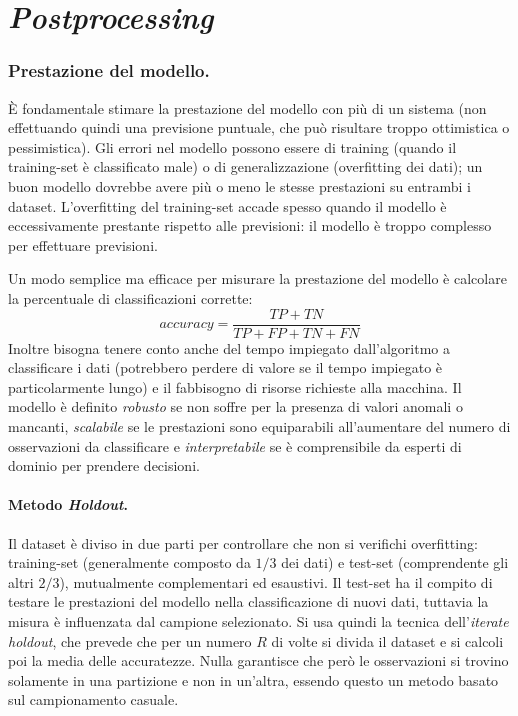 \documentclass[11pt, a4page, twocolumn]{article}
\begin{document}
\newpage
\part{\textit{Postprocessing}}

\section{Prestazione del modello.}
È fondamentale stimare la prestazione del modello con più di un sistema (non effettuando quindi una previsione puntuale, che può risultare troppo ottimistica o pessimistica).
Gli errori nel modello possono essere di training (quando il training-set è classificato male) o di generalizzazione (overfitting dei dati); un buon modello dovrebbe avere più o meno le stesse prestazioni su entrambi i dataset.
L'overfitting del training-set accade spesso quando il modello è eccessivamente prestante rispetto alle previsioni: il modello è troppo complesso per effettuare previsioni.

Un modo semplice ma efficace per misurare la prestazione del modello è calcolare la percentuale di classificazioni corrette:
\begin{equation*}
  accuracy = \frac{TP + TN}{TP + FP + TN + FN}
\end{equation*}
Inoltre bisogna tenere conto anche del tempo impiegato dall'algoritmo a classificare i dati (potrebbero perdere di valore se il tempo impiegato è particolarmente lungo) e il fabbisogno di risorse richieste alla macchina.
Il modello è definito \textit{robusto} se non soffre per la presenza di valori anomali o mancanti, \textit{scalabile} se le prestazioni sono equiparabili all'aumentare del numero di osservazioni da classificare e \textit{interpretabile} se è comprensibile da esperti di dominio per prendere decisioni. \newline

\subsection{Metodo \textit{Holdout}.}
Il dataset è diviso in due parti per controllare che non si verifichi overfitting: training-set (generalmente composto da $1/3$ dei dati) e test-set (comprendente gli altri $2/3$), mutualmente complementari ed esaustivi.
Il test-set ha il compito di testare le prestazioni del modello nella classificazione di nuovi dati, tuttavia la misura è influenzata dal campione selezionato.
Si usa quindi la tecnica dell'\textit{iterate holdout}, che prevede che per un numero $R$ di volte si divida il dataset e si calcoli poi la media delle accuratezze.
Nulla garantisce che però le osservazioni si trovino solamente in una partizione e non in un'altra, essendo questo un metodo basato sul campionamento casuale.
\end{document}
